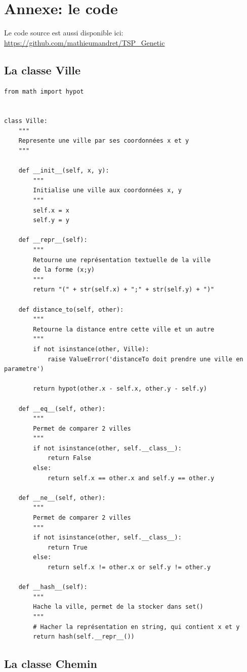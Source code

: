 \documentclass[12pt]{article}
\begin{document}
\clearpage
\section{Annexe: le code}
Le code source est aussi disponible ici: \url{https://github.com/mathieumandret/TSP_Genetic}
\subsection*{La classe Ville}
\begin{verbatim}
from math import hypot


class Ville:
    """
    Represente une ville par ses coordonnées x et y
    """

    def __init__(self, x, y):
        """
        Initialise une ville aux coordonnées x, y
        """
        self.x = x
        self.y = y

    def __repr__(self):
        """
        Retourne une représentation textuelle de la ville
        de la forme (x;y)
        """
        return "(" + str(self.x) + ";" + str(self.y) + ")"

    def distance_to(self, other):
        """
        Retourne la distance entre cette ville et un autre
        """
        if not isinstance(other, Ville):
            raise ValueError('distanceTo doit prendre une ville en parametre')

        return hypot(other.x - self.x, other.y - self.y)

    def __eq__(self, other):
        """
        Permet de comparer 2 villes
        """
        if not isinstance(other, self.__class__):
            return False
        else:
            return self.x == other.x and self.y == other.y

    def __ne__(self, other):
        """
        Permet de comparer 2 villes
        """
        if not isinstance(other, self.__class__):
            return True
        else:
            return self.x != other.x or self.y != other.y

    def __hash__(self):
        """
        Hache la ville, permet de la stocker dans set()
        """
        # Hacher la représentation en string, qui contient x et y
        return hash(self.__repr__())
\end{verbatim}

\subsection*{La classe Chemin}
\end{document}
